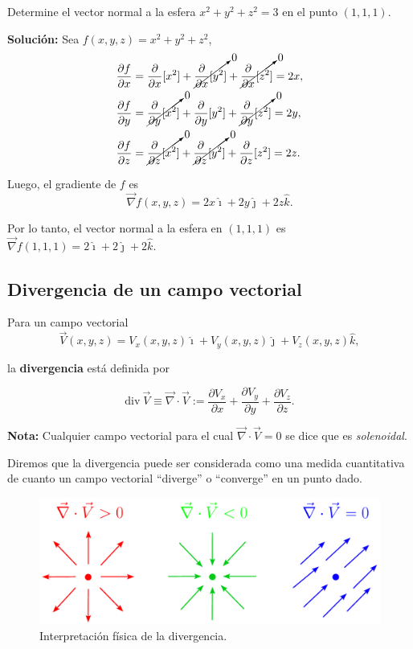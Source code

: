 \begin{ejemplo}
    Determine el vector normal a la esfera $x^2+y^2+z^2 = 3$ en el punto $(1,1,1)$.

    \textbf{Solución:} Sea $f(x,y,z) = x^2+y^2+z^2$, 
    \begin{align*}
        \frac{\partial f}{\partial x} &= \frac{\partial}{\partial x}[x^2] + \cancelto{0}{\frac{\partial}{\partial x}[y^2]} + \cancelto{0}{\frac{\partial}{\partial x}[z^2]} = 2x,   \\
        \frac{\partial f}{\partial y} &=\cancelto{0}{\frac{\partial}{\partial y}[x^2]} + \frac{\partial}{\partial y}[y^2] + \cancelto{0}{\frac{\partial}{\partial y}[z^2]} = 2y, \\
        \frac{\partial f}{\partial z} &=\cancelto{0}{\frac{\partial}{\partial z}[x^2]} + \cancelto{0}{\frac{\partial}{\partial z}[y^2]} + \frac{\partial}{\partial z}[z^2]  = 2z.
    \end{align*}

    Luego, el gradiente de $f$ es
    $$\Vec{\nabla} f(x,y,z) = 2x \hat{\imath} + 2y \hat{\jmath} + 2z \hat{k}.$$

    Por lo tanto, el vector normal a la esfera en $(1,1,1)$ es $\Vec{\nabla} f(1,1,1) = 2 \hat{\imath} + 2 \hat{\jmath} + 2 \hat{k}.$
\end{ejemplo}

\subsection*{Divergencia de un campo vectorial}

Para un campo vectorial
$$\vec{V} (x,y,z) = V_x(x,y,z) \hat{\imath} + V_y(x,y,z) \hat{\jmath} + V_z(x,y,z) \hat{k} ,$$

la \textbf{divergencia} está definida por
\begin{shaded}
    $$\mbox{div} ~\vec{V} \equiv \vec{\nabla} \cdot \vec{V} := \frac{\partial V_x}{\partial x} + \frac{\partial V_y}{\partial y} + \frac{\partial V_z}{\partial z}.$$
\end{shaded}

\textbf{Nota:} Cualquier campo vectorial para el cual $\vec{\nabla} \cdot \vec{V} = 0$ se dice que es \textit{solenoidal}.

Diremos que la divergencia puede ser considerada como una medida cuantitativa de cuanto un campo vectorial “diverge” o “converge” en un punto dado. 

\begin{figure}[H]
    \centering
    \includegraphics[scale = 0.55]{Figuras/Divergencia.pdf}
    \caption{Interpretación física de la divergencia.}
    \label{fig:sign_divergence}
\end{figure}

